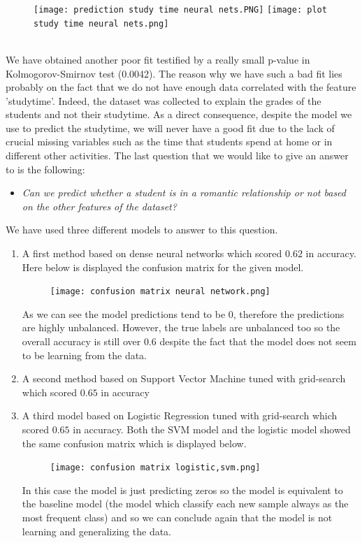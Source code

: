 \documentclass[a4paper, 11pt]{article}
\theoremstyle{definition}
\numberwithin{equation}{section}		%
\numberwithin{table}{section}				%
\begin{document}
\begin{figure}[H]\centering
\texttt{[image: prediction study time neural nets.PNG]}
\texttt{[image: plot study time neural nets.png]}
\end{figure}
\\
We have obtained another poor fit testified by a really small p-value in Kolmogorov-Smirnov test (0.0042). The reason why we have such a bad fit lies probably on the fact that we do not have enough data correlated with the feature 'studytime'. Indeed, the dataset was collected to explain the grades of the students and not their studytime. As a direct consequence, despite the model we use to predict the studytime, we will never have a good fit due to the lack of crucial missing variables such as the time that students spend at home or in different other activities.
The last question that we would like to give an answer to is the following:
\begin{itemize}
    \item \textit{Can we predict whether a student is in a romantic relationship or not based on the other features of the dataset?}
\end{itemize}
We have used three different models to answer to this question.
\begin{enumerate}
    \item A first method based on dense neural networks which scored $0.62$ in accuracy. Here below is displayed the confusion matrix for the given model.
    \begin{figure}[H]\centering
\texttt{[image: confusion matrix neural network.png]}
\end{figure}
As we can see the model predictions tend to be $0$, therefore the predictions are highly unbalanced. However, the true labels are unbalanced too so the overall accuracy is still over $0.6$ despite the fact that the model does not seem to be learning from the data.
    \item A second method based on Support Vector Machine tuned with grid-search which scored $0.65$ in accuracy 
    \item A third model based on Logistic Regression tuned with grid-search which scored $0.65$ in accuracy.
    Both the SVM model and the logistic model showed the same confusion matrix which is displayed below.
       \begin{figure}[H]\centering
\texttt{[image: confusion matrix logistic,svm.png]}
\end{figure}
In this case the model is just predicting zeros so the model is equivalent to the baseline model (the model which classify each new sample always as the most frequent class) and so we can conclude again that the model is not learning and generalizing the data.
\end{enumerate}
\end{document}
